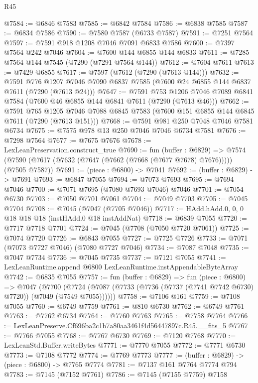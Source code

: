 \begin{lexlean}{R45}
\begin{coremodule}
{@7584 := @6846 @7583
@7585 := @6842 @7584
@7586 := @6838 @7585
@7587 := @6834 @7586
@7590 := @7580 @7587 (@6733 @7587)
@7591 := @7251 @7564
@7597 := @7591 @918 @1208 @7046 @7091 @6833 @7586
@7600 := @7397 @7564 @242 @7046
@7604 := @7600 @144 @6855 @144 @6833
@7611 := @7285 @7564 @144 @7545 (@7290 (@7291 @7564 @144))
@7612 := @7604 @7611
@7613 := @7429 @6855
@7617 := @7597 (@7612 (@7290 (@7613 @144)))
@7632 := @7591
    @776
    @1207
    @7046
    @7090
    @6837
    @7585
    (@7600 @24 @6855 @144 @6837 @7611 (@7290 (@7613 @24)))
@7647 := @7591
    @753
    @1206
    @7046
    @7089
    @6841
    @7584
    (@7600 @46 @6855 @144 @6841 @7611 (@7290 (@7613 @46)))
@7662 := @7591
    @765
    @1205
    @7046
    @7088
    @6845
    @7583
    (@7600 @151 @6855 @144 @6845 @7611 (@7290 (@7613 @151)))
@7668 := @7591 @981 @250 @7048 @7046 @7581 @6734
@7675 := @7575 @978 @13 @250 @7046 @7046 @6734 @7581
@7676 := @7298 @7564
@7677 := @7675 @7676
@7678 := LexLeanPreservation.construct_true
@7690 := fun (buffer : @6829) =>
  @7574 (@7590 (@7617 (@7632 (@7647 (@7662 (@7668 (@7677 @7678) @7676))))) (@7505 @7587))
@7691 := (piece : @6800) -> @7041
@7692 := (buffer : @6829) -> @7691
@7693 := @6847 @7055
@7694 := @7073 @7693
@7695 := @7694 @7046
@7700 := @7071 @7695 (@7080 @7693 @7046) @7046
@7701 := @7054 @6730
@7703 := @7050 @7701 @7061
@7704 := @7049 @7703
@7705 := @7045 @7704
@7708 := @7045 (@7047 (@7705 @7046))
@7717 := HAdd.hAdd.{0, 0, 0} @18 @18 @18 (instHAdd.{0} @18 instAddNat)
@7718 := @6839 @7055
@7720 := @7717 @7718 @7701
@7724 := @7045 (@7708 (@7050 @7720 @7061))
@7725 := @7074 @7720
@7726 := @6843 @7055
@7727 := @7725 @7726
@7733 := @7071 (@7073 @7727 @7046) (@7080 @7727 @7046)
@7734 := @7087 @7048
@7735 := @7047 @7734
@7736 := @7045 @7735
@7737 := @7121 @7055
@7741 := LexLeanRuntime.append @6800 LexLeanRuntime.instAppendableByteArray
@7742 := @6835 @7055
@7757 := fun (buffer : @6829) =>
  fun (piece : @6800) =>
  @7047
    (@7700 (@7724 (@7087 (@7733 (@7736 (@7737 (@7741 @7742 @6730) @7720)) (@7049 (@7549 @7055))))))
@7758 := @7106 @161
@7759 := @7108 @7055
@7760 := @6749 @7759
@7761 := @810 @6730
@7762 := @6749 @7761
@7763 := @7762 @6734
@7764 := @7760 @7763
@7765 := @7758 @7764
@7766 := LexLeanPreserve.Cf696ba2c1b7a80aa3461f4d56447897c.R45.__fits_5
@7767 := @7766 @7055
@7768 := @7767 @6730
@7769 := @7120 @7768
@7770 := LexLeanStd.Buffer.writeBytes
@7771 := @7770 @7055
@7772 := @7771 @6730
@7773 := @7108 @7772
@7774 := @7769 @7773
@7777 := (buffer : @6829) -> (piece : @6800) -> @7765 @7774
@7781 := @7137 @161 @7764 @7774 @794
@7783 := @7145 (@7152 @7761)
@7786 := @7145 (@7155 @7759) @7158
}
\end{coremodule}
\end{lexlean}
